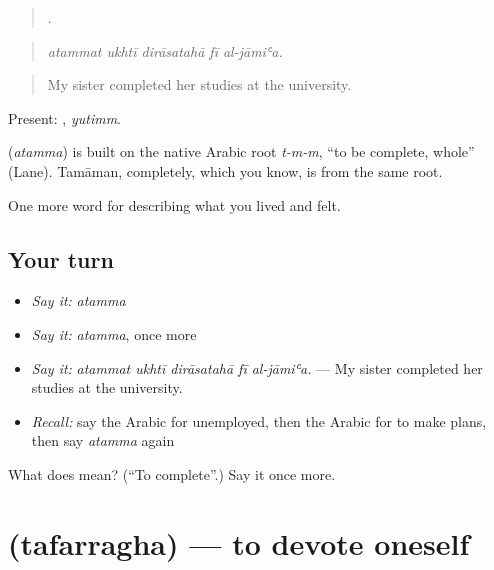 \begin{quote}
    .
\end{quote}

\begin{quote}
\emph{atammat ukhtī dirāsatahā fī al-jāmiʿa.}
\end{quote}

\begin{quote}
My sister completed her studies at the university.
\end{quote}

Present: , \emph{yutimm}.

\begin{cousinweb}
\textbf{} (\emph{atamma}) is built on the native Arabic root \emph{t-m-m}, \textquotedblleft{}to be complete, whole\textquotedblright{} (Lane). Tamāman, completely, which you know, is from the same root.
\end{cousinweb}

\begin{grammarlens}[title={What you've built}]
One more word for describing what you lived and felt.
\end{grammarlens}

\subsection*{Your turn}
\begin{itemize}
\raggedright
  \item \emph{Say it:} \emph{atamma}
  \item \emph{Say it:} \emph{atamma}, once more
  \item \emph{Say it:} \emph{atammat ukhtī dirāsatahā fī al-jāmiʿa.} — My sister completed her studies at the university.
  \item \emph{Recall:} say the Arabic for unemployed, then the Arabic for to make plans, then say \emph{atamma} again
\end{itemize}

\begin{tcolorbox}[breakable,colback=teal!4,colframe=teal!35!black,title={Before you move on}]
What does  mean? (\textquotedblleft{}To complete\textquotedblright{}.) Say it once more.
\end{tcolorbox}
\section[\texorpdfstring{\ar{تفرغ} (tafarragha)}{تفرغ (tafarragha)}]{ (tafarragha) — to devote oneself}

